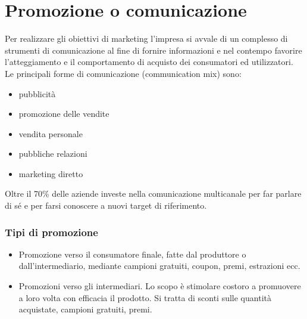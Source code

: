 \section{Promozione o comunicazione}
Per realizzare gli obiettivi di marketing l’impresa si avvale di un complesso di strumenti di comunicazione al fine di fornire informazioni e nel contempo favorire l’atteggiamento e il comportamento di acquisto dei consumatori ed utilizzatori. \newline
Le principali forme di comunicazione (communication mix) sono:
\begin{itemize}
	\item pubblicità
	\item promozione delle vendite
	\item vendita personale
	\item pubbliche relazioni
	\item marketing diretto	
\end{itemize}

Oltre il 70\% delle aziende investe nella comunicazione multicanale per far parlare di sé e per farsi conoscere a nuovi target di riferimento.


\subsubsection{Tipi di promozione}
\begin{itemize}
	\item Promozione verso il consumatore finale, fatte dal produttore o dall'intermediario, mediante campioni gratuiti, coupon, premi, estrazioni ecc.
	\item Promozioni verso gli intermediari. Lo scopo è stimolare costoro	a promuovere a loro volta con efficacia il prodotto. Si tratta di sconti sulle quantità acquistate, campioni gratuiti, premi.
\end{itemize}



